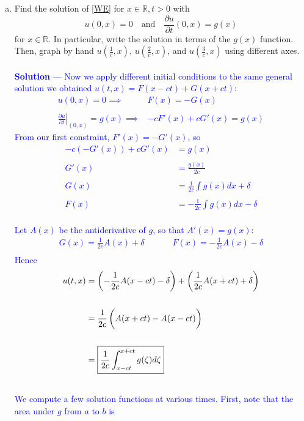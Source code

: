 \documentclass[12pt]{article}
\begin{document}
\begin{enumerate}[(a)]
\item Find the solution of \eqref{WE} for $x \in \mathbb{R}, t > 0$ with 
$$u(0,x) = 0 \quad \mathrm{and} \quad \frac{\partial u}{\partial t}(0,x) = g(x)$$
for $x \in \mathbb{R}$. In particular, write the solution in terms of the $g(x)$ function. Then, graph by hand $u(\frac{1}{c},x)$, $u(\frac{2}{c},x)$, and $u(\frac{3}{c},x)$ using different axes. \\ \\
\textcolor{blue}{\textbf{Solution} — Now we apply different initial conditions to the same general solution we obtained $u(t,x) = F(x-ct) + G(x+ct)$: \\
\begin{align*}
u(0,x) = 0 \implies& F(x) = -G(x) \\ \\
\left. \frac{\partial u}{\partial t} \right |_{(0,x)} = g(x) \implies& -cF'(x) + cG'(x) = g(x)
\end{align*}
From our first constraint, $F'(x) = -G'(x)$, so
\begin{align*}
-c(-G'(x)) + cG'(x) &= g(x) \\ \\
G'(x) &= \frac{g(x)}{2c} \\ \\
G(x) &= \frac{1}{2c} \int g(x)dx + \delta \\ \\
F(x) &= -\frac{1}{2c} \int g(x)dx - \delta
\end{align*} \\
Let $A(x)$ be the antiderivative of $g$, so that $A'(x) = g(x)$: \\
\begin{align*}
G(x) = \frac{1}{2c}A(x) + \delta &\;\;\;\;\;\;\;\;\; F(x) = -\frac{1}{2c} A(x) - \delta \\
\end{align*}
Hence
\begin{align*}
u(t,x) &=  \left( -\frac{1}{2c} A(x-ct) - \delta \right) + \left( \frac{1}{2c}A(x+ct) + \delta \right)  \\ \\
&=  \frac{1}{2c}  \left( \vphantom{\frac{1}{2c}} A(x+ct) - A(x-ct) \right)   \\ \\
&=  \boxed{\frac{1}{2c}  \int_{x-ct}^{x+ct} g(\zeta) d\zeta } \\ \\
\end{align*}
We compute a few solution functions at various times. First, note that the area under $g$ from $a$ to $b$ is
}
\end{enumerate}
\end{document}
